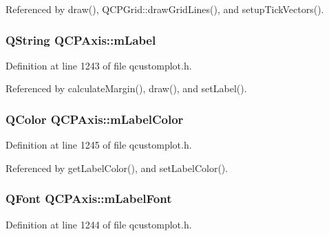 Referenced by draw(), Q\+C\+P\+Grid\+::draw\+Grid\+Lines(), and setup\+Tick\+Vectors().

\hypertarget{class_q_c_p_axis_ae8001dbdfc47685c1cf7b98b044460e6}{}
\subsubsection[{m\+Label}]{\setlength{\rightskip}{0pt plus 5cm}Q\+String Q\+C\+P\+Axis\+::m\+Label\hspace{0.3cm}{\ttfamily [protected]}}\label{class_q_c_p_axis_ae8001dbdfc47685c1cf7b98b044460e6}


Definition at line 1243 of file qcustomplot.\+h.



Referenced by calculate\+Margin(), draw(), and set\+Label().

\hypertarget{class_q_c_p_axis_a457a003bb1c2b6ab73e5a173ba7558fd}{}
\subsubsection[{m\+Label\+Color}]{\setlength{\rightskip}{0pt plus 5cm}Q\+Color Q\+C\+P\+Axis\+::m\+Label\+Color\hspace{0.3cm}{\ttfamily [protected]}}\label{class_q_c_p_axis_a457a003bb1c2b6ab73e5a173ba7558fd}


Definition at line 1245 of file qcustomplot.\+h.



Referenced by get\+Label\+Color(), and set\+Label\+Color().

\hypertarget{class_q_c_p_axis_a37442d470e30e19b81ecaf979a34d046}{}
\subsubsection[{m\+Label\+Font}]{\setlength{\rightskip}{0pt plus 5cm}Q\+Font Q\+C\+P\+Axis\+::m\+Label\+Font\hspace{0.3cm}{\ttfamily [protected]}}\label{class_q_c_p_axis_a37442d470e30e19b81ecaf979a34d046}


Definition at line 1244 of file qcustomplot.\+h.



